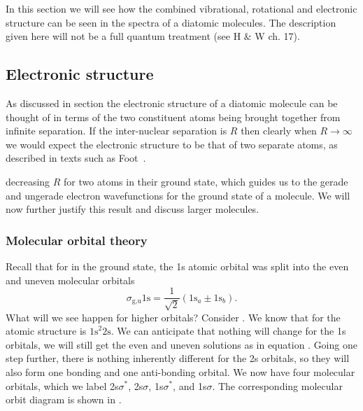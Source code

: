 
In this section we will see how the combined vibrational, rotational and
electronic structure can be seen in the spectra of a diatomic molecules. The
description given here will not be a full quantum treatment (see H \& W ch. 17).

\subsection{Electronic structure}

As discussed in section  the electronic structure of a
diatomic molecule can be thought of in terms of the two constituent atoms being
brought together from infinite separation. If the inter-nuclear separation is
$R$ then clearly when $R \to \infty$ we would expect the electronic structure to
be that of two separate atoms, as described in texts such as
Foot~\cite{Foot2005}.

 decreasing $R$ for two  atoms in their
ground state, which guides us to the gerade and ungerade electron wavefunctions
for the ground state of a  molecule. We will now further justify this
result and discuss larger molecules.

\subsubsection{Molecular orbital theory}


Recall that for  in the ground state, the 1s atomic orbital was split into the
even and uneven molecular orbitals
%
\begin{equation}
  \sigma_\text{g,u} 1\mathrm{s} = \frac{1}{\sqrt{2}} ( 1\mathrm{s}_a \pm
  1\mathrm{s}_b ).
\end{equation}
%
What will we see happen for higher orbitals? Consider . We know that
for  the atomic structure is $\text{1s}^2\text{2s}$. We can anticipate
that nothing will change for the 1s orbitals, we will still get the even and
uneven solutions as in equation . Going one step further, there is
nothing inherently different for the 2s orbitals, so they will also form one
bonding and one anti-bonding orbital. We now have four molecular orbitals, which
we label 2s$\sigma^*$, 2s$\sigma$, 1s$\sigma^*$, and 1s$\sigma$.  The
corresponding molecular orbit diagram is shown in .

